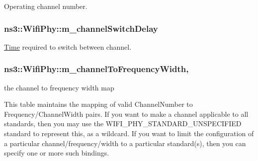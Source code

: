 Operating channel number. 

\subsubsection[{\texorpdfstring{m\+\_\+channel\+Switch\+Delay}{m_channelSwitchDelay}}]{ ns3\+::\+Wifi\+Phy\+::m\+\_\+channel\+Switch\+Delay\hspace{0.3cm}{\ttfamily [private]}}\hypertarget{classns3_1_1WifiPhy_a138b7bdd10dd952ebab47eb7c8e1ad11}{}\label{classns3_1_1WifiPhy_a138b7bdd10dd952ebab47eb7c8e1ad11}


\hyperlink{classns3_1_1Time}{Time} required to switch between channel. 

\subsubsection[{\texorpdfstring{m\+\_\+channel\+To\+Frequency\+Width}{m_channelToFrequencyWidth}}]{ ns3\+::\+Wifi\+Phy\+::m\+\_\+channel\+To\+Frequency\+Width\hspace{0.3cm}{\ttfamily [static]}, {\ttfamily [private]}}\hypertarget{classns3_1_1WifiPhy_ad19aaf8e6db288dcfbba6fce31dccbaf}{}\label{classns3_1_1WifiPhy_ad19aaf8e6db288dcfbba6fce31dccbaf}


the channel to frequency width map 

This table maintains the mapping of valid Channel\+Number to Frequency/\+Channel\+Width pairs. If you want to make a channel applicable to all standards, then you may use the W\+I\+F\+I\+\_\+\+P\+H\+Y\+\_\+\+S\+T\+A\+N\+D\+A\+R\+D\+\_\+\+U\+N\+S\+P\+E\+C\+I\+F\+I\+ED standard to represent this, as a wildcard. If you want to limit the configuration of a particular channel/frequency/width to a particular standard(s), then you can specify one or more such bindings. 
